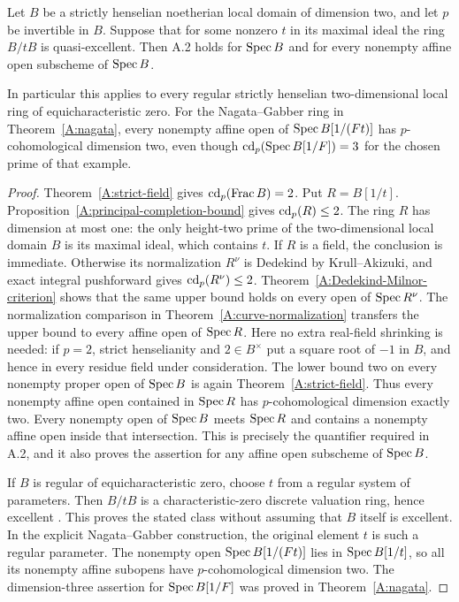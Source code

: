 \begin{theorem}
\label{A:A2-local-surface}
Let $B$ be a strictly henselian noetherian local domain of dimension
two, and let $p$ be invertible in $B$. Suppose that for some
nonzero $t$ in its maximal ideal the ring $B/tB$ is quasi-excellent.
Then A.2 holds for $\operatorname{Spec} B$ and for every nonempty affine open
subscheme of $\operatorname{Spec} B$.

In particular this applies to every regular strictly henselian
two-dimensional local ring of equicharacteristic zero. For the
Nagata--Gabber ring in Theorem~\ref{A:nagata},
every nonempty affine open of $\operatorname{Spec} B[1/(Ft)]$ has
$p$-cohomological dimension two, even though
$\operatorname{cd}_p(\operatorname{Spec} B[1/F])=3$ for the chosen prime of that example.
\end{theorem}
\begin{proof}
Theorem~\ref{A:strict-field} gives
$\operatorname{cd}_p(\operatorname{Frac} B)=2$. Put $R=B[1/t]$.
Proposition~\ref{A:principal-completion-bound} gives
$\operatorname{cd}_p(R)\leq2$. The ring $R$ has dimension at most one:
the only height-two prime of the two-dimensional local domain $B$
is its maximal ideal, which contains $t$. If $R$ is a field,
the conclusion is immediate. Otherwise its normalization
$R^\nu$ is Dedekind by Krull--Akizuki, and exact integral
pushforward gives $\operatorname{cd}_p(R^\nu)\leq2$.
Theorem~\ref{A:Dedekind-Milnor-criterion} shows that the same
upper bound holds on every open of $\operatorname{Spec} R^\nu$.
The normalization comparison in
Theorem~\ref{A:curve-normalization} transfers the upper bound
to every affine open of $\operatorname{Spec} R$.
Here no extra real-field shrinking is needed: if $p=2$,
strict henselianity and $2\in B^\times$ put a square root of
$-1$ in $B$, and hence in every residue field under consideration.
The lower bound two on every nonempty proper open of $\operatorname{Spec} B$
is again Theorem~\ref{A:strict-field}. Thus every nonempty
affine open contained in $\operatorname{Spec} R$ has $p$-cohomological dimension
exactly two.
Every nonempty open of $\operatorname{Spec} B$ meets $\operatorname{Spec} R$ and contains
a nonempty affine open inside that intersection. This is precisely
the quantifier required in A.2, and it also proves the assertion
for any affine open subscheme of $\operatorname{Spec} B$.

If $B$ is regular of equicharacteristic zero, choose $t$ from a
regular system of parameters. Then $B/tB$ is a characteristic-zero
discrete valuation ring, hence excellent
\citep[Expos\'e I, Proposition 3.1]{A_ILO2014}.
This proves the stated class without assuming that $B$ itself
is excellent. In the explicit Nagata--Gabber construction,
the original element $t$ is such a regular parameter.
The nonempty open $\operatorname{Spec} B[1/(Ft)]$ lies in $\operatorname{Spec} B[1/t]$,
so all its nonempty affine subopens have $p$-cohomological dimension
two.
The dimension-three assertion for $\operatorname{Spec} B[1/F]$ was proved
in Theorem~\ref{A:nagata}.
\end{proof}

